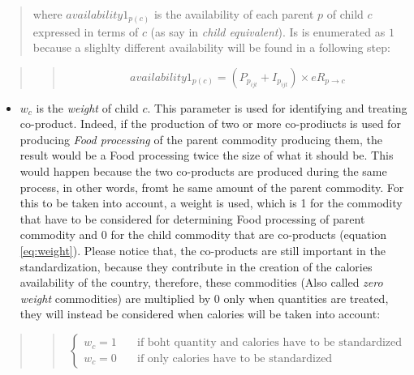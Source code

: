 \documentclass[]{article}
\providecommand{\tightlist}{%
  \setlength{\itemsep}{0pt}\setlength{\parskip}{0pt}}
\begin{document}
\begin{quote}
where \(availability1_{p(c)}\) is the availability of each parent \(p\)
of child \(c\) expressed in terms of \(c\) (as say in \emph{child
equivalent}). Is is enumerated as \(1\) because a slighlty different
availability will be found in a following step:
\end{quote}

\begin{quote}
\begin{quote}
\begin{equation}
\label{eq:availability 1}
availability1_{p(c)} = (P_{p_{ijt}} + I_{p_{ijt}})\times eR_{p\to c}
\end{equation}
\end{quote}
\end{quote}

\begin{itemize}
\tightlist
\item
  \(w_{c}\) is the \emph{weight} of child \(c\). This parameter is used
  for identifying and treating co-product. Indeed, if the production of
  two or more co-prodiucts is used for producing \emph{Food processing}
  of the parent commodity producing them, the result would be a Food
  processing twice the size of what it should be. This would happen
  because the two co-products are produced during the same process, in
  other words, fromt he same amount of the parent commodity. For this to
  be taken into account, a weight is used, which is 1 for the commodity
  that have to be considered for determining Food processing of parent
  commodity and 0 for the child commodity that are co-products (equation
  \ref{eq:weight}). Please notice that, the co-products are still
  important in the standardization, because they contribute in the
  creation of the calories availability of the country, therefore, these
  commodities (Also called \emph{zero weight} commodities) are
  multiplied by 0 only when quantities are treated, they will instead be
  considered when calories will be taken into account:
\end{itemize}

\begin{quote}
\begin{quote}
\begin{equation}
\label{eq:weight}
\begin{cases}
w_{c} = 1      & \quad \text{if boht quantity and calories have to be standardized} \\
w_{c} = 0      & \quad \text{if only calories have to be standardized}
\end{cases}
\end{equation}
\end{quote}
\end{quote}
\end{document}
